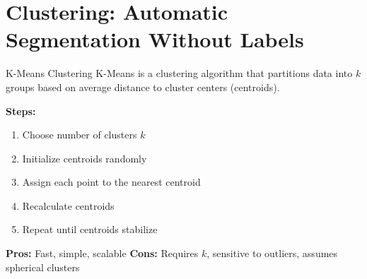 \documentclass[aspectratio=169, table]{beamer}
\begin{document}
\section{Clustering: Automatic Segmentation Without Labels}

\begin{frame}{K-Means Clustering}
	K-Means is a clustering algorithm that partitions data into \(k\) groups based on average distance to cluster centers (centroids).
	
	\textbf{Steps:}
	\begin{enumerate}
		\item Choose number of clusters \(k\)
		\item Initialize centroids randomly
		\item Assign each point to the nearest centroid
		\item Recalculate centroids
		\item Repeat until centroids stabilize
	\end{enumerate}
	
	\textbf{Pros:} Fast, simple, scalable  
	\textbf{Cons:} Requires \(k\), sensitive to outliers, assumes spherical clusters
\end{frame}
\end{document}
